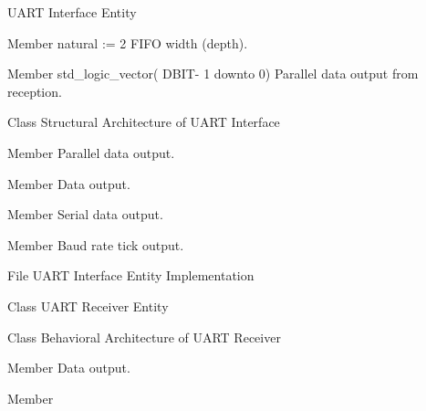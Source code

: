 \begin{DoxyRefList}
%
 UART Interface Entity 
\item[Member \doxylink{classuart_a5300a12082350406618a83d2adaeef83}{uart.FIFO\+\_\+W} natural \+:= 2]\label{brief__brief000060}%
%
 FIFO width (depth).  
\item[Member \doxylink{classuart_a20f317dc09f223fdeb538339f8032ea9}{uart.r\+\_\+data} std\+\_\+logic\+\_\+vector( DBIT-\/ 1 downto 0) ]\label{brief__brief000061}%
%
 Parallel data output from reception.  
\item[Class \doxylink{classuart_1_1structural}{uart.structural} ]\label{brief__brief000062}%
%
 Structural Architecture of UART Interface 
\item[Member \doxylink{classuart_1_1structural_a576cc2b7670fbb1753a2eb96fe3c0d1d}{uart.structural.fifo} ]\label{brief__brief000065}%
%
 Parallel data output.  
\item[Member \doxylink{classuart_1_1structural_adeddca5f4fe6074d6d63b3e011a02ca5}{uart.structural.tick} ]\label{brief__brief000066}%
%
 Data output.  
\item[Member \doxylink{classuart_1_1structural_addf6a9a572ef84949a21d72fc26b2497}{uart.structural.uart\+\_\+rx} ]\label{brief__brief000064}%
%
 Serial data output.  
\item[Member \doxylink{classuart_1_1structural_a6c58c94e66d38e41efd03b5400f7d411}{uart.structural.uart\+\_\+tx} ]\label{brief__brief000063}%
%
 Baud rate tick output.  
\item[File \doxylink{uart_8vhdl}{uart.vhdl} ]\label{brief__brief000058}%
%
 UART Interface Entity Implementation 
\item[Class \doxylink{classuart__rx}{uart\+\_\+rx} ]\label{brief__brief000068}%
%
 UART Receiver Entity 
\item[Class \doxylink{classuart__rx_1_1behavioral}{uart\+\_\+rx.behavioral} ]\label{brief__brief000071}%
%
 Behavioral Architecture of UART Receiver 
\item[Member \doxylink{classuart__rx_1_1behavioral_a6a880a0d780cd5e4e54fb5d6081f2e21}{uart\+\_\+rx.behavioral.n\+\_\+counter\+\_\+max} ]\label{brief__brief000074}%
%
 Data output.  
\item[Member \doxylink{classuart__rx_1_1behavioral_abb1f4b1077fed42215491ace6164cf2c}{uart\+\_\+rx.behavioral.register\+\_\+d} ]\label{brief__brief000073}%

\end{DoxyRefList}
